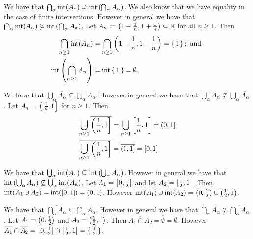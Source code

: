 \documentclass[letterpaper, 11pt, oneside]{book}
\begin{document}
\begin{ex}
  We have that $\bigcap_{\alpha} \inte(A_{\alpha}) \containseq \inte\pqty{\bigcap_{\alpha} A_{\alpha}}$.
  We also know that we have equality in the case of finite intersections.
  However in general we have that $\bigcap_{\alpha} \inte(A_{\alpha}) \not\subseteq \inte\pqty{ \bigcap_{\alpha} A_{\alpha}}$.
  Let $A_{n} \defeq \pqty{1 - \frac{1}{n}, 1 + \frac{1}{n}} \subseteq \R$ for all $n \geq 1$.
  Then
  \begin{align*}
    \Bigcap_{n \geq 1} \inte(A_{n}) &= \Bigcap_{n \geq 1} \pqty{1 - \frac{1}{n}, 1 + \frac{1}{n}} = \set{1}; \text{ and } \\
    \inte\pqty{\Bigcap_{n \geq 1} A_{n}} &= \inte \set{1} = \emptyset.
  \end{align*}
\end{ex}

\begin{ex}
  We have that $\bigcup_{\alpha} \overline{A_{\alpha}} \subseteq \overline{\bigcup_{\alpha} A_{\alpha}}$.
  However in general we have that  $\overline{\bigcup_{\alpha} A_{\alpha}} \not\subseteq \bigcup_{\alpha} \overline{A_{\alpha}}$.
  Let $A_{n} = \left( \frac{1}{n}, 1 \right]$ for $n \geq 1$.
  Then
  \begin{align*}
    \Bigcup_{n \geq 1} \overline{\left( \frac{1}{n}, 1 \right]} &= \Bigcup_{n \geq 1} \bqty{\frac{1}{n}, 1} =  (0, 1] \\
    \overline{\Bigcup_{n \geq 1} \left( \frac{1}{n}, 1 \right]} &= \overline{(0, 1]} = [0, 1]
  \end{align*}
\end{ex}

\begin{ex}
  We have that $\bigcup_{\alpha} \inte(A_{\alpha}) \subseteq \inte\pqty{\bigcup_{\alpha} A_{\alpha}}$.
  However in general we have that $\inte\pqty{\bigcup_{\alpha} A_{\alpha}} \not\subseteq \bigcup_{\alpha} \inte(A_{\alpha})$.
  Let $A_{1} = \bqty{0, \frac{1}{2}}$ and let $A_{2} = \bqty{\frac{1}{2}, 1}$.
  Then $\operatorname{int}(A_{1} \cup A_{2}) = \operatorname{int}([0, 1]) = (0, 1)$.
  However $\inte(A_{1}) \cup \inte(A_{2}) = \pqty{0, \frac{1}{2}} \cup \pqty{\frac{1}{2}, 1}$.
\end{ex}

\begin{ex}
  We have that $\overline{\bigcap_{\alpha} A_{\alpha}} \subseteq \bigcap_{\alpha} \overline{A_{\alpha}}$.
  However in general we have that $\bigcap_{\alpha} \overline{A_{\alpha}} \not\subseteq \overline{\bigcap_{\alpha} A_{\alpha}}$.
  Let $A_{1} = \pqty{0, \frac{1}{2}}$ and $A_{2} = \pqty{\frac{1}{2}, 1}$.
  Then $\overline{A_{1} \cap A_{2}} = \overline{\emptyset} = \emptyset$.
  However $\overline{A_{1}} \cap \overline{A_{2}} = \bqty{0, \frac{1}{2}} \cap \bqty{\frac{1}{2}, 1} = \set{\frac{1}{2}}$.
\end{ex}
\end{document}
